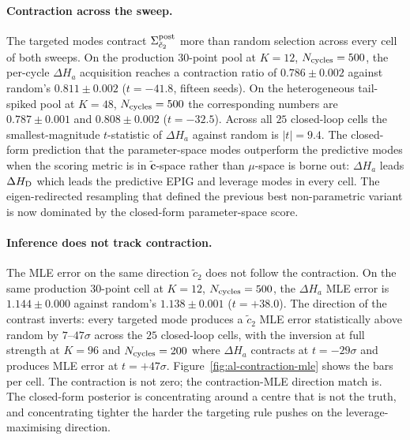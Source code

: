 \documentclass[11pt,a4paper]{article}
\begin{document}
\paragraph{Contraction across the sweep.}
The targeted modes contract $\Sigma_{\tilde c_2}^{\rm post}$ more than random selection across every cell of both sweeps. On the production $30$-point pool at $K = 12$, $N_{\rm cycles} = 500$, the per-cycle $\Delta H_a$ acquisition reaches a contraction ratio of $0.786 \pm 0.002$ against random's $0.811 \pm 0.002$ ($t = -41.8$, fifteen seeds). On the heterogeneous tail-spiked pool at $K = 48$, $N_{\rm cycles} = 500$ the corresponding numbers are $0.787 \pm 0.001$ and $0.808 \pm 0.002$ ($t = -32.5$). Across all $25$ closed-loop cells the smallest-magnitude $t$-statistic of $\Delta H_a$ against random is $|t| = 9.4$. The closed-form prediction that the parameter-space modes outperform the predictive modes when the scoring metric is in $\tilde{\bm{c}}$-space rather than $\mu$-space is borne out: $\Delta H_a$ leads $\Delta H_{\rm D}$ which leads the predictive EPIG and leverage modes in every cell. The eigen-redirected resampling that defined the previous best non-parametric variant is now dominated by the closed-form parameter-space score.

\paragraph{Inference does not track contraction.}
The MLE error on the same direction $\tilde{c}_2$ does not follow the contraction. On the same production $30$-point cell at $K = 12$, $N_{\rm cycles} = 500$, the $\Delta H_a$ MLE error is $1.144 \pm 0.000$ against random's $1.138 \pm 0.001$ ($t = +38.0$). The direction of the contrast inverts: every targeted mode produces a $\tilde c_2$ MLE error statistically above random by $7$--$47\sigma$ across the $25$ closed-loop cells, with the inversion at full strength at $K = 96$ and $N_{\rm cycles} = 200$ where $\Delta H_a$ contracts at $t = -29\sigma$ and produces MLE error at $t = +47\sigma$. Figure~\ref{fig:al-contraction-mle} shows the bars per cell. The contraction is not zero; the contraction-MLE direction match is. The closed-form posterior is concentrating around a centre that is not the truth, and concentrating tighter the harder the targeting rule pushes on the leverage-maximising direction.
\end{document}
